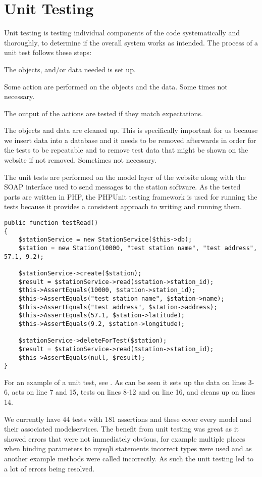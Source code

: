 \section{Unit Testing}
Unit testing is testing individual components of the code systematically and thoroughly, to determine if the overall system works as intended.
The process of a unit test follows these steps:

\begin{description}[style=nextline]
\item[Set Up] The objects, and/or data needed is set up.
\item[Action] Some action are performed on the objects and the data.
Some times not necessary.
\item[Test] The output of the actions are tested if they match expectations.
\item[Tear Down/Clean Up] The objects and data are cleaned up. This is specifically important for us because we insert data into a database and it needs to be removed afterwards in order for the tests to be repeatable and to remove test data that might be shown on the website if not removed. 
Sometimes not necessary.
\end{description}

The unit tests are performed on the model layer of the website along with the SOAP interface used to send messages to the station software.
As the tested parts are written in PHP, the PHPUnit testing framework is used for running the tests because it provides a consistent approach to writing and running them.

\begin{lstlisting}[caption = {Example of a unit test}, label = {lst:unitTestExample}]
public function testRead()
{
	$stationService = new StationService($this->db);
	$station = new Station(10000, "test station name", "test address", 57.1, 9.2);

	$stationService->create($station);
	$result = $stationService->read($station->station_id);
	$this->AssertEquals(10000, $station->station_id);
	$this->AssertEquals("test station name", $station->name);
	$this->AssertEquals("test address", $station->address);
	$this->AssertEquals(57.1, $station->latitude);
	$this->AssertEquals(9.2, $station->longitude);

	$stationService->deleteForTest($station);
	$result = $stationService->read($station->station_id);
	$this->AssertEquals(null, $result);
}
\end{lstlisting}

For an example of a unit test, see .
As can be seen it sets up the data on lines 3-6, acts on line 7 and 15, tests on lines 8-12 and on line 16, and cleans up on lines 14.

We currently have 44 tests with 181 assertions and these cover every model and their associated modelservices. 
The benefit from unit testing was great as it showed errors that were not immediately obvious, for example multiple places when binding parameters to mysqli statements incorrect types were used and as another example methods were called incorrectly.
As such the unit testing led to a lot of errors being resolved.

